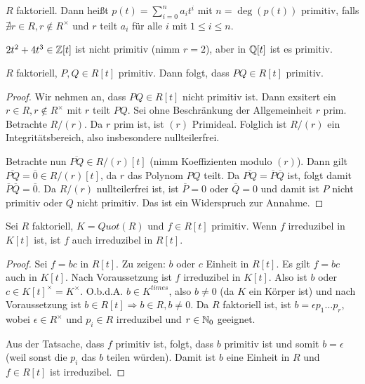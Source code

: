 \documentclass[12pt,a4paper]{scrartcl}
\begin{document}
\begin{defi}
	$R$ faktoriell. Dann heißt $p(t ) = \sum_{i = 0}^na_it^i$ mit $n = \deg (p(t))$ primitiv, falls $\nexists r\in R, r\notin R^{\times}$ und $r$ teilt $a_i$ für alle $i$ mit $1\leq i\leq n$.
\end{defi}

\begin{bsp}
	$2t^2+4t^3\in\mathbb Z[t]$ ist nicht primitiv (nimm $r = 2$), aber in $\mathbb Q[t]$ ist es primitiv.
\end{bsp}

\begin{lem}
	$R$ faktoriell, $P,Q\in R[t]$ primitiv. Dann folgt, dass $PQ\in R[t]$ primitiv.	
\end{lem}

\begin{proof}
	Wir nehmen an, dass $PQ\in R[t]$ nicht primitiv ist. Dann exsitert ein $r\in R, r\notin R^{\times}$ mit $r$ teilt $PQ$. Sei ohne Beschränkung der Allgemeinheit $r$ prim. Betrachte $R/(r)$. Da $r$ prim ist, ist $(r)$ Primideal. Folglich ist $R/(r)$ ein Integritätsbereich, also insbesondere nullteilerfrei.
	
	Betrachte nun $\overline{PQ} \in R/(r)[t]$ (nimm Koeffizienten modulo $(r)$). Dann gilt $\overline{PQ} = \overline{0}\in R/(r)[t]$, da $r$ das Polynom $PQ$ teilt. Da $\overline{PQ} = \overline{P}\overline{Q}$ ist, folgt damit $\overline{P}\overline{Q} = \overline{0}$. Da $R/(r)$ nullteilerfrei ist, ist $\overline{P} = 0$ oder $\overline{Q} = 0$ und damit ist $P$ nicht primitiv oder $Q$ nicht primitiv. Das ist ein Widerspruch zur Annahme.
\end{proof}

\begin{lem}
	Sei $R$ faktoriell, $K = Quot (R)$ und $f\in R[t]$ primitiv. Wenn  $f$ irreduzibel in $K[t]$ ist, ist $f$ auch irreduzibel in $R[t]$. 
\end{lem}

\begin{proof}
	Sei $f = bc$ in $R[t]$. Zu zeigen: $b$ oder $c$ Einheit in $R[t]$. Es gilt $f = bc$ auch in $K[t]$. Nach Voraussetzung ist $f$ irreduzibel in $K[t]$. Also ist $b$ oder $c\in K[t]^{\times} = K^{\times}$. O.b.d.A. $b\in K^{times}$, also $b \neq 0$ (da $K$ ein Körper ist) und nach Voraussetzung ist $b\in R[t]\Rightarrow b\in R, b\neq 0$. Da $R$ faktoriell ist, ist $b = \epsilon p_1\dots p_r$, wobei $\epsilon\in R^{\times}$ und $p_i\in R$ irreduzibel und $r\in\mathbb N_0$ geeignet.
	
	Aus der Tatsache, dass $f$ primitiv ist, folgt, dass $b$ primitiv ist und somit $b = \epsilon$ (weil sonst die $p_i$ das $b$ teilen würden). Damit ist $b$ eine Einheit in $R$ und $f\in R[t]$ ist irreduzibel.
\end{proof}
\end{document}
